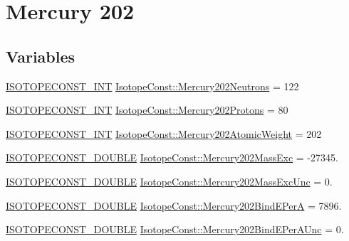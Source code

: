 \hypertarget{group___isotope_const-_mercury-_hg202}{}\section{Mercury 202}
\label{group___isotope_const-_mercury-_hg202}
\subsection*{Variables}
\begin{DoxyCompactItemize}
\item 
\mbox{\hyperlink{group___isotope_const-_macros_ga5f18360b3e99483a35c32d789e62621c}{I\+S\+O\+T\+O\+P\+E\+C\+O\+N\+S\+T\+\_\+\+I\+NT}} \mbox{\hyperlink{group___isotope_const-_mercury-_hg202_ga35753fe9fcd75ae17797db5664ff4073}{Isotope\+Const\+::\+Mercury202\+Neutrons}} = 122
\item 
\mbox{\hyperlink{group___isotope_const-_macros_ga5f18360b3e99483a35c32d789e62621c}{I\+S\+O\+T\+O\+P\+E\+C\+O\+N\+S\+T\+\_\+\+I\+NT}} \mbox{\hyperlink{group___isotope_const-_mercury-_hg202_ga045c69f301ffbcd5d6061fd72c666ba5}{Isotope\+Const\+::\+Mercury202\+Protons}} = 80
\item 
\mbox{\hyperlink{group___isotope_const-_macros_ga5f18360b3e99483a35c32d789e62621c}{I\+S\+O\+T\+O\+P\+E\+C\+O\+N\+S\+T\+\_\+\+I\+NT}} \mbox{\hyperlink{group___isotope_const-_mercury-_hg202_ga04ce522408fe7205dd2242346e088d34}{Isotope\+Const\+::\+Mercury202\+Atomic\+Weight}} = 202
\item 
\mbox{\hyperlink{group___isotope_const-_macros_ga8f45a7272ce02c0b4c65c44636ed719a}{I\+S\+O\+T\+O\+P\+E\+C\+O\+N\+S\+T\+\_\+\+D\+O\+U\+B\+LE}} \mbox{\hyperlink{group___isotope_const-_mercury-_hg202_ga077138db374644ae16c107581ff498a1}{Isotope\+Const\+::\+Mercury202\+Mass\+Exc}} = -\/27345.
\item 
\mbox{\hyperlink{group___isotope_const-_macros_ga8f45a7272ce02c0b4c65c44636ed719a}{I\+S\+O\+T\+O\+P\+E\+C\+O\+N\+S\+T\+\_\+\+D\+O\+U\+B\+LE}} \mbox{\hyperlink{group___isotope_const-_mercury-_hg202_ga183bf624fa3b6276b30b1d95c868ab25}{Isotope\+Const\+::\+Mercury202\+Mass\+Exc\+Unc}} = 0.
\item 
\mbox{\hyperlink{group___isotope_const-_macros_ga8f45a7272ce02c0b4c65c44636ed719a}{I\+S\+O\+T\+O\+P\+E\+C\+O\+N\+S\+T\+\_\+\+D\+O\+U\+B\+LE}} \mbox{\hyperlink{group___isotope_const-_mercury-_hg202_gad42f3801290841975d503d4bc8b838d9}{Isotope\+Const\+::\+Mercury202\+Bind\+E\+PerA}} = 7896.
\item 
\mbox{\hyperlink{group___isotope_const-_macros_ga8f45a7272ce02c0b4c65c44636ed719a}{I\+S\+O\+T\+O\+P\+E\+C\+O\+N\+S\+T\+\_\+\+D\+O\+U\+B\+LE}} \mbox{\hyperlink{group___isotope_const-_mercury-_hg202_ga231a3d84837d0ec942efcd1bca0b3425}{Isotope\+Const\+::\+Mercury202\+Bind\+E\+Per\+A\+Unc}} = 0.

\end{DoxyCompactItemize}

